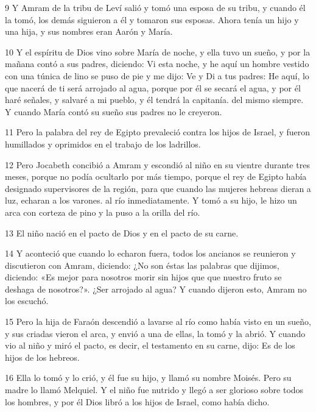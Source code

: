 \par 9 Y Amram de la tribu de Leví salió y tomó una esposa de su tribu, y cuando él la tomó, los demás siguieron a él y tomaron sus esposas. Ahora tenía un hijo y una hija, y sus nombres eran Aarón y María.

\par 10 Y el espíritu de Dios vino sobre María de noche, y ella tuvo un sueño, y por la mañana contó a sus padres, diciendo: Vi esta noche, y he aquí un hombre vestido con una túnica de lino se puso de pie y me dijo: Ve y Di a tus padres: He aquí, lo que nacerá de ti será arrojado al agua, porque por él se secará el agua, y por él haré señales, y salvaré a mi pueblo, y él tendrá la capitanía. del mismo siempre. Y cuando María contó su sueño sus padres no le creyeron.

\par 11 Pero la palabra del rey de Egipto prevaleció contra los hijos de Israel, y fueron humillados y oprimidos en el trabajo de los ladrillos.

\par 12 Pero Jocabeth concibió a Amram y escondió al niño en su vientre durante tres meses, porque no podía ocultarlo por más tiempo, porque el rey de Egipto había designado supervisores de la región, para que cuando las mujeres hebreas dieran a luz, echaran a los varones. al río inmediatamente. Y tomó a su hijo, le hizo un arca con corteza de pino y la puso a la orilla del río.

\par 13 El niño nació en el pacto de Dios y en el pacto de su carne.

\par 14 Y aconteció que cuando lo echaron fuera, todos los ancianos se reunieron y discutieron con Amram, diciendo: ¿No son éstas las palabras que dijimos, diciendo: «Es mejor para nosotros morir sin hijos que que nuestro fruto se deshaga de nosotros?». ¿Ser arrojado al agua? Y cuando dijeron esto, Amram no los escuchó.

\par 15 Pero la hija de Faraón descendió a lavarse al río como había visto en un sueño, y sus criadas vieron el arca, y envió a una de ellas, la tomó y la abrió. Y cuando vio al niño y miró el pacto, es decir, el testamento en su carne, dijo: Es de los hijos de los hebreos.

\par 16 Ella lo tomó y lo crió, y él fue su hijo, y llamó su nombre Moisés. Pero su madre lo llamó Melquiel. Y el niño fue nutrido y llegó a ser glorioso sobre todos los hombres, y por él Dios libró a los hijos de Israel, como había dicho.

